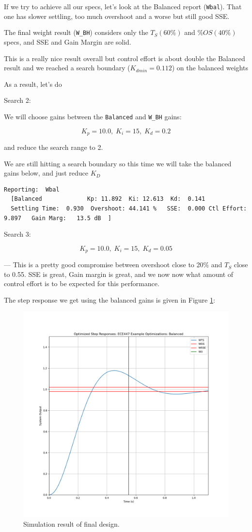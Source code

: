 If we try to achieve all our specs, let's look at the Balanced
report ({\tt Wbal}).  That one has slower settling, too much overshoot and a worse but still good SSE.

The final weight result ({\tt W\_BH})
considers only
the $T_S (60\%)$ and $\%OS (40\%)$ specs, and SSE and Gain Margin are solid.

This is a really nice result overall but control effort is about double the
Balanced result and we reached a search boundary ($K_{dmin}=0.112$) on the balanced weights

As a result, let's do

Search 2:

We will choose gains between the {\tt Balanced} and {\tt W\_BH} gains:

 \[
 K_p = 10.0, \; K_i = 15, \; K_d = 0.2
 \]

and reduce the search range to 2.

We are still hitting a search boundary so this time we will take the balanced gains
below, and just reduce $K_D$

\begin{verbatim}
Reporting:  Wbal
  [Balanced             Kp: 11.892  Ki: 12.613  Kd:  0.141
  Settling Time:  0.930  Overshoot: 44.141 %   SSE:  0.000 Ctl Effort:  9.897   Gain Marg:   13.5 dB  ]
\end{verbatim}

Search 3:

\[
K_p = 10.0, \; K_i = 15, \; K_d = 0.05
\]




---
This is a pretty good compromise between overshoot close to 20\%
and $T_S$ close to 0.55.   SSE is great, Gain margin is great,
and we now now what amount of control effort is to be expected
for this performance.

The step response we get using the balanced gains is given
in Figure \ref{FinalDesignSim}:

\begin{figure}\centering
\includegraphics[width=4.5in]{figs10/S43Q02.png}
\caption{Simulation result of final design.}\label{FinalDesignSim}
\end{figure}




